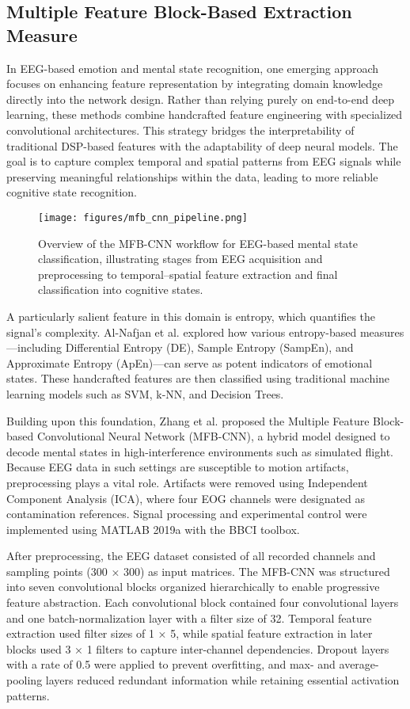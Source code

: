 \documentclass[conference]{IEEEtran}
\begin{document}
\subsection{Multiple Feature Block-Based Extraction Measure}
In EEG-based emotion and mental state recognition, one emerging approach focuses on enhancing feature representation by integrating domain knowledge directly into the network design. Rather than relying purely on end-to-end deep learning, these methods combine handcrafted feature engineering with specialized convolutional architectures. This strategy bridges the interpretability of traditional DSP-based features with the adaptability of deep neural models. The goal is to capture complex temporal and spatial patterns from EEG signals while preserving meaningful relationships within the data, leading to more reliable cognitive state recognition.

\begin{figure}[H]
    \centering
    \texttt{[image: figures/mfb\_cnn\_pipeline.png]}
    \caption{Overview of the MFB-CNN workflow for EEG-based mental state classification, illustrating stages from EEG acquisition and preprocessing to temporal–spatial feature extraction and final classification into cognitive states.}
    \label{fig:mfb_cnn_pipeline}
\end{figure}

A particularly salient feature in this domain is entropy, which quantifies the signal’s complexity. Al-Nafjan et al. \cite{b3} explored how various entropy-based measures—including Differential Entropy (DE), Sample Entropy (SampEn), and Approximate Entropy (ApEn)—can serve as potent indicators of emotional states. These handcrafted features are then classified using traditional machine learning models such as SVM, k-NN, and Decision Trees.

Building upon this foundation, Zhang et al. \cite{b4} proposed the Multiple Feature Block-based Convolutional Neural Network (MFB-CNN), a hybrid model designed to decode mental states in high-interference environments such as simulated flight. Because EEG data in such settings are susceptible to motion artifacts, preprocessing plays a vital role. Artifacts were removed using Independent Component Analysis (ICA), where four EOG channels were designated as contamination references. Signal processing and experimental control were implemented using MATLAB 2019a with the BBCI toolbox.

After preprocessing, the EEG dataset consisted of all recorded channels and sampling points (300 × 300) as input matrices. The MFB-CNN was structured into seven convolutional blocks organized hierarchically to enable progressive feature abstraction. Each convolutional block contained four convolutional layers and one batch-normalization layer with a filter size of 32. Temporal feature extraction used filter sizes of 1 × 5, while spatial feature extraction in later blocks used 3 × 1 filters to capture inter-channel dependencies. Dropout layers with a rate of 0.5 were applied to prevent overfitting, and max- and average-pooling layers reduced redundant information while retaining essential activation patterns.
\end{document}
